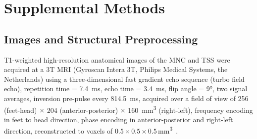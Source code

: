 \documentclass{article}
\begin{document}
    \FloatBarrier


    \section{Supplemental Methods}

    \subsection{Images and Structural Preprocessing}
    \label{subsec:supp_images_and_preprocessing}
    T1-weighted high-resolution anatomical images of the MNC and TSS were acquired at a 3T MRI (Gyroscan Intera 3T, Philips Medical Systems, the Netherlands) using a three-dimensional fast gradient echo sequence (turbo field echo), repetition time = \SI{7.4}{\milli\second}, echo time = \SI{3.4}{\milli\second}, flip angle = \ang{9}, two signal averages, inversion pre-pulse every \SI{814.5}{\milli\second}, acquired over a field of view of 256 (feet-head) $\times$ 204 (anterior-posterior) $\times$ \SI{160}{\cubic\milli\meter} (right-left), frequency encoding in feet to head direction, phase encoding in anterior-posterior and right-left direction, reconstructed to voxels of $0.5 \times 0.5 \times 0.5$\,\si{\cubic\milli\meter}~\cite{Dannlowski2015b, Dannlowski2015a}.
\end{document}
